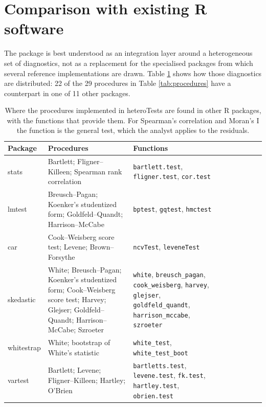 \section{Comparison with existing R software}\label{comparison-with-existing-r-software}

The package is best understood as an integration layer around a heterogeneous
set of diagnostics, not as a replacement for the specialised packages from
which several reference implementations are drawn. Table
\ref{tab:software-comparison} shows how those diagnostics are distributed:
22 of the 29 procedures in Table
\ref{tab:procedures} have a counterpart in one of 11 other
packages.

\begin{table}[!t]

\caption{\label{tab:software-comparison}Where the procedures implemented in heteroTests are found in other R packages, with the functions that provide them. For Spearman's correlation and Moran's I the function is the general test, which the analyst applies to the residuals.}
\centering
\begin{tabular}[t]{l>{\raggedright\arraybackslash}p{5.8cm}>{\raggedright\arraybackslash}p{4.6cm}l>{\raggedright\arraybackslash}p{5.8cm}>{\raggedright\arraybackslash}p{4.6cm}l>{\raggedright\arraybackslash}p{5.8cm}>{\raggedright\arraybackslash}p{4.6cm}}
\toprule
Package & Procedures & Functions\\
\midrule
stats & Bartlett; Fligner--Killeen; Spearman rank correlation & \texttt{bartlett.test}, \texttt{fligner.test}, \texttt{cor.test}\\
\addlinespace
lmtest & Breusch--Pagan; Koenker's studentized form; Goldfeld--Quandt; Harrison--McCabe & \texttt{bptest}, \texttt{gqtest}, \texttt{hmctest}\\
\addlinespace
car & Cook--Weisberg score test; Levene; Brown--Forsythe & \texttt{ncvTest}, \texttt{leveneTest}\\
\addlinespace
skedastic & White; Breusch--Pagan; Koenker's studentized form; Cook--Weisberg score test; Harvey; Glejser; Goldfeld--Quandt; Harrison--McCabe; Szroeter & \texttt{white}, \texttt{breusch\_pagan}, \texttt{cook\_weisberg}, \texttt{harvey}, \texttt{glejser}, \texttt{goldfeld\_quandt}, \texttt{harrison\_mccabe}, \texttt{szroeter}\\
\addlinespace
whitestrap & White; bootstrap of White's statistic & \texttt{white\_test}, \texttt{white\_test\_boot}\\
\addlinespace
vartest & Bartlett; Levene; Fligner--Killeen; Hartley; O'Brien & \texttt{bartletts.test}, \texttt{levene.test}, \texttt{fk.test}, \texttt{hartley.test}, \texttt{obrien.test}\\

\end{tabular}
\end{table}
